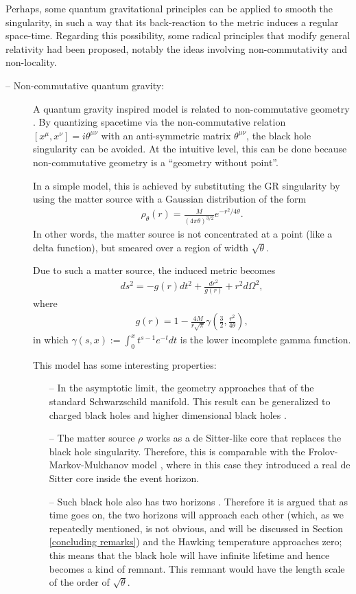 \documentclass[12pt]{article}
\newcommand{\2}{$^2$}
\newcommand{\3}{$^3$}
\newcommand{\4}{$_4$}
\newcommand{\5}{$_5$}
\begin{document}
Perhaps, some quantum gravitational principles can be applied to smooth the singularity, in such a way that its back-reaction to the metric induces a regular space-time. Regarding this possibility, some radical principles that modify general relativity had been proposed, notably the ideas involving non-commutativity and non-locality.
\begin{description}
\item[-- Non-commutative quantum gravity:] A quantum gravity inspired model is related to non-commutative geometry \cite{Nicolini:2005vd,PN}. By quantizing spacetime via the non-commutative relation $[x^{\mu},x^{\nu}] = i \theta^{\mu\nu}$ with an anti-symmetric matrix $\theta^{\mu\nu}$, the black hole singularity can be avoided. At the intuitive level, this can be done because non-commutative geometry is a ``geometry without point''.

In a simple model, this is achieved by substituting the GR singularity by using the matter source with a Gaussian distribution of the form 
\begin{eqnarray}
\rho_{\theta}(r) = \frac{M}{(4\pi \theta)^{3/2}} e^{-r^{2}/4\theta}. 
\end{eqnarray}
In other words, the matter source is not concentrated at a point (like a delta function), but smeared over a region of width $\sqrt{\theta}$. 

Due to such a matter source, the induced metric becomes
\begin{eqnarray}
ds^{2} = - g(r) dt^{2} + \frac{dr^{2}}{g(r)} + r^{2} d\Omega^{2},
\end{eqnarray}
where
\begin{eqnarray}
g(r) = 1- \frac{4M}{r\sqrt{\pi}} \gamma\left( \frac{3}{2}, \frac{r^{2}}{4\theta}\right),
\end{eqnarray}
in which $\gamma(s,x):=\int_0^x t^{s-1}e^{-t} dt$ is the lower incomplete gamma function.

This model has some interesting properties:
\begin{itemize}
\item[--] In the asymptotic limit, the geometry approaches that of the standard Schwarzschild manifold. This result can be generalized to charged black holes \cite{Ansoldi:2006vg} and higher dimensional black holes \cite{Spallucci:2009zz}.
\item[--] The matter source $\rho$ works as a de Sitter-like core that replaces the black hole singularity. Therefore, this is comparable with the Frolov-Markov-Mukhanov model \cite{Frolov:1988vj}, where in this case they introduced a real de Sitter core inside the event horizon. 
\item[--] Such black hole also has two horizons \cite{0611130,1204.0143}. Therefore it is argued that as time goes on, the two horizons will approach each other (which, as we repeatedly mentioned, is not obvious, and will be discussed in Section \ref{concluding remarks}) and the Hawking temperature approaches zero; this means that the black hole will have infinite lifetime and hence becomes a kind of remnant. This remnant would have the length scale of the order of $\sqrt{\theta}$.
\end{itemize}


\end{description}
\end{document}
